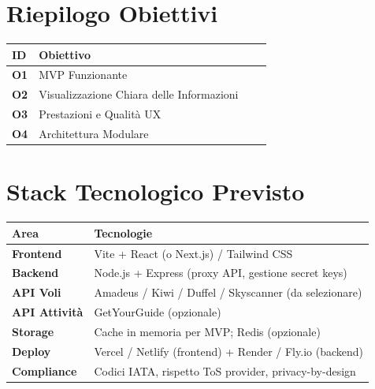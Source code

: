 \documentclass[a4paper, 11pt]{article}
\begin{document}
\newpage

\section{Riepilogo Obiettivi}

\vspace{4pt}
\begin{center}
\begin{tabularx}{0.95\textwidth}{@{}
  >{\bfseries\centering\arraybackslash}p{1cm}
  >{\raggedright\arraybackslash}X
  >{\centering\arraybackslash}p{2.2cm}
  >{\centering\arraybackslash}p{2.4cm}
@{}}
\toprule
\rowcolor{light}
\textbf{ID} & \textbf{Obiettivo} \\
\midrule
O1 & MVP Funzionante                            \\[2pt]
O2 & Visualizzazione Chiara delle Informazioni  \\[2pt]
O3 & Prestazioni e Qualit\`a UX                 \\[2pt]
O4 & Architettura Modulare                      \\[2pt]
\bottomrule
\end{tabularx}
\end{center}

\section{Stack Tecnologico Previsto}

\vspace{4pt}
\begin{tabularx}{\textwidth}{@{} >{\bfseries}p{3.2cm} X @{}}
\toprule
\rowcolor{light}
\textbf{Area} & \textbf{Tecnologie} \\
\midrule
Frontend      & Vite + React (o Next.js) / Tailwind CSS \\[2pt]
Backend       & Node.js + Express (proxy API, gestione secret keys) \\[2pt]
API Voli      & Amadeus / Kiwi / Duffel / Skyscanner (da selezionare) \\[2pt]
API Attivit\`a & GetYourGuide (opzionale) \\[2pt]
Storage       & Cache in memoria per MVP; Redis (opzionale) \\[2pt]
Deploy        & Vercel / Netlify (frontend) + Render / Fly.io (backend) \\[2pt]
Compliance    & Codici IATA, rispetto ToS provider, privacy-by-design \\
\bottomrule
\end{tabularx}

\vspace{20pt}
\end{document}
